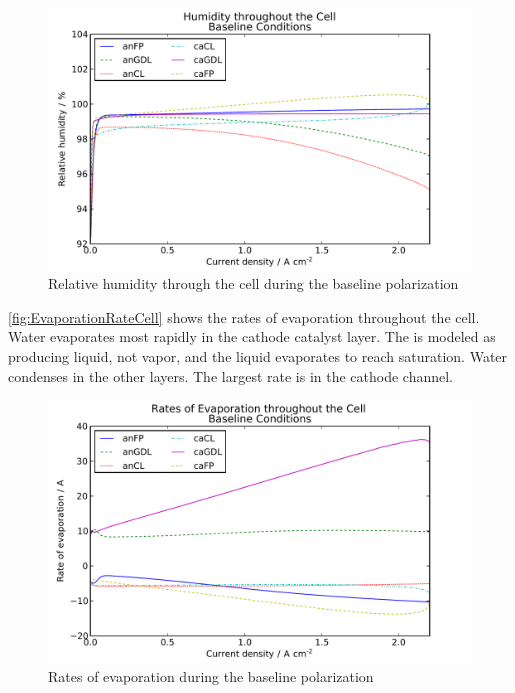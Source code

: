 \begin{figure}[htbp]
  \includegraphics[width=\linewidth]{Results/Cell/Model/1/Humidity}%
  \caption{Relative humidity through the cell during the baseline polarization}%
  \label{fig:BaselineRH}
\end{figure}

\autoref{fig:EvaporationRateCell} shows the rates of evaporation throughout the cell.  Water evaporates most rapidly in the cathode catalyst layer.  The  is modeled as producing liquid, not vapor, and the liquid evaporates to reach saturation.  Water condenses in the other layers.  The largest rate is in the cathode channel.

\begin{figure}[htbp]
  \includegraphics[width=\linewidth]{Results/Cell/Model/1/EvaporationRate}%
  \caption{Rates of evaporation during the baseline polarization}%
  \label{fig:EvaporationRateCell}
\end{figure}

